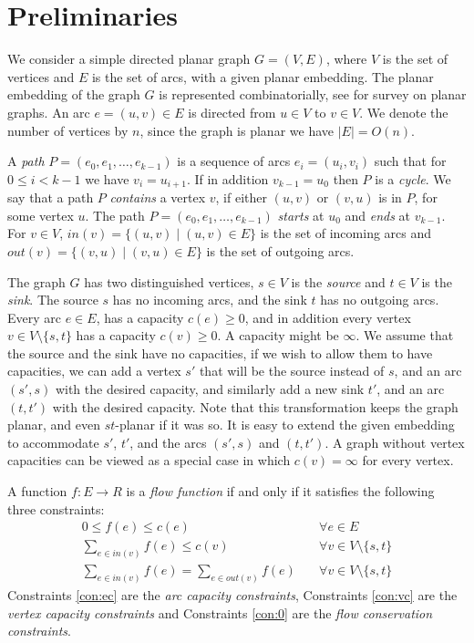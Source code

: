 \documentclass[a4paper,11pt]{article}
\begin{document}
\section{Preliminaries}

We consider a simple directed planar graph  $G = (V, E)$, where $V$
is the set of vertices and $E$ is the set of arcs, with a given
planar embedding. The planar embedding of the graph $G$ is
represented combinatorially, see \cite{NC88}
for survey on planar graphs. An arc $e = (u, v) \in E$ is directed
from $u \in V$ to $v \in V$. We denote the number of vertices by
$n$, since  the graph is planar we have $|E| = O(n)$.

A \emph{path} $P = (e_0, e_1, \dots, e_{k-1})$ is a sequence of arcs $e_i = (u_i, v_i)$ such that for $0 \leq i < k-1$ we have $v_i = u_{i+1}$. If in addition $v_{k-1} = u_0$ then $P$ is a \emph{cycle}. We say that a path $P$ \emph{contains} a vertex $v$, if either $(u, v)$ or $(v, u)$ is in $P$, for some vertex $u$. The path $P = (e_0, e_1, \dots, e_{k-1})$ \emph{starts} at $u_0$ and \emph{ends} at $v_{k-1}$.
For $v \in V$, $in(v) = \{(u, v) \mid (u, v) \in
E\}$ is the set of incoming arcs and $out(v) = \{(v, u) \mid (v, u)
\in E\}$ is the set of outgoing arcs.

The graph $G$ has two distinguished vertices, $s \in V$ is the
\emph{source} and $t \in V$ is the \emph{sink}. The source $s$ has no
incoming arcs, and the sink $t$ has no outgoing arcs. Every arc $e \in E$,
has a capacity $c(e) \geq 0$, and in addition every vertex $v \in V
\setminus \{s, t\}$ has a capacity $c(v) \geq 0$. A capacity might be $\infty$. We assume that the
source and the sink have no capacities, if we wish to allow them to
have capacities, we can add a vertex $s'$ that will be the source
instead of $s$, and an arc $(s', s)$ with the desired capacity, and
similarly add a new sink $t'$, and an arc $(t, t')$ with the desired
capacity. Note that this transformation keeps the graph planar, and
even $st$-planar if it was so. It
is easy to extend the given embedding to accommodate $s'$, $t'$,
and the arcs $(s',s)$ and $(t,t')$. A graph without vertex
capacities can be viewed as a special case in which $c(v) = \infty$
for every vertex.

A function $f: E \to R$ is a \emph{flow function} if and only if
it satisfies the following three constraints:
\begin{align}
    0 \leq f(e) \leq c(e) \quad &\forall e \in E \label{con:ec} \\
    \sum_{e \in in(v)} f(e) \leq c(v) \quad &\forall v \in V \setminus \{s, t\} \label{con:vc} \\
    \sum_{e \in in(v)} f(e) = \sum_{e \in out(v)} f(e) \quad &\forall v \in V \setminus \{s, t\} \label{con:0}
\end{align}
Constraints \eqref{con:ec} are the \emph{arc capacity
  constraints}, Constraints \eqref{con:vc} are the
\emph{vertex capacity constraints} and Constraints \eqref{con:0}
are the \emph{flow conservation constraints}.
\end{document}
